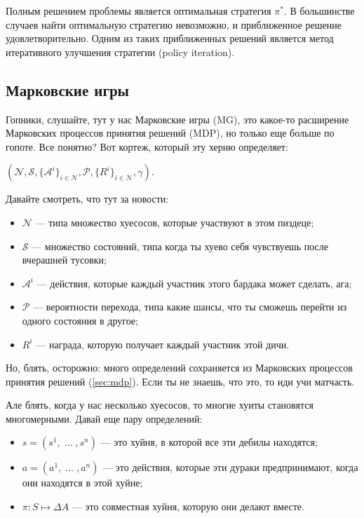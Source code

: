 Полным решением проблемы является оптимальная стратегия \(\pi^*\). В большинстве случаев найти оптимальную стратегию невозможно, и приближенное решение удовлетворительно. Одним из таких приближенных решений является метод итеративного улучшения стратегии (policy iteration).

\subsection{Марковские игры} \label{sec:markov-games}

Гопники, слушайте, тут у нас Марковские игры (MG), это какое-то расширение Марковских процессов принятия решений (MDP), но только еще больше по гопоте. Все понятно? Вот кортеж, который эту херню определяет:

\((\mathcal{N}, \mathcal{S}, \{\mathcal{A}^i\}_{i \in \mathcal{N}}, \mathcal{P}, \{R^i\}_{i \in \mathcal{N}}, \gamma)\).

Давайте смотреть, что тут за новости:
\begin{itemize}[label=---]
	\item \(\mathcal{N}\) --- типа множество хуесосов, которые участвуют в этом пиздеце;
	\item \(\mathcal{S}\) --- множество состояний, типа когда ты хуево себя чувствуешь после вчерашней тусовки;
	\item \(\mathcal{A}^i\) ---  действия, которые каждый участник этого бардака может сделать, ага;
	\item \(\mathcal{P}\) --- вероятности перехода, типа какие шансы, что ты сможешь перейти из одного состояния в другое;
	\item \(R^i\) --- награда, которую получает каждый участник этой дичи.
\end{itemize}

Но, блять, осторожно: много определений сохраняется из Марковских процессов принятия решений (\ref{sec:mdp}). Если ты не знаешь, что это, то иди учи матчасть.

Але блять, когда у нас несколько хуесосов, то многие хуиты становятся многомерными. Давай еще пару определений:

\begin{itemize}[label=---]
	\item \(s = (s^1, \; \dots \;, s^n)\) --- это хуйня, в которой все эти дебилы находятся;
	\item \(a = (a^1, \; \dots \;, a^n)\) --- это действия, которые эти дураки предпринимают, когда они находятся в этой хуйне;
	\item \( \pi : S \mapsto \Delta A \) --- это совместная хуйня, которую они делают вместе.
\end{itemize}

